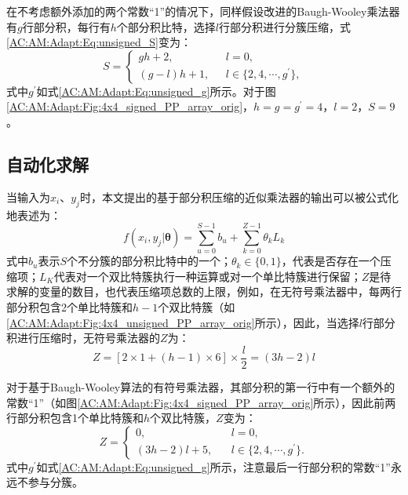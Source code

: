 在不考虑额外添加的两个常数“1”的情况下，同样假设改进的Baugh-Wooley乘法器有$g$行部分积，每行有$h$个部分积比特，选择$l$行部分积进行分簇压缩，式\eqref{AC:AM:Adapt:Eq:unsigned_S}变为：
\begin{equation}
    \label{AC:AM:Adapt:Eq:signed_S}
        S = \left\{
          \begin{aligned}
            gh + 2, \ \ \ & \ \ \ l = 0, \\
            (g - l)h + 1, & \ \ \ l \in \{2, 4, \cdots, g^{\prime} \},
          \end{aligned}
          \right.
\end{equation}
式中$g^{\prime}$如式\eqref{AC:AM:Adapt:Eq:unsigned_g}所示。对于图\ref{AC:AM:Adapt:Fig:4x4_signed_PP_array_orig}，$ h = g = g^{\prime} = 4 $，$ l = 2 $，$ S = 9 $。


\subsection{自动化求解}

当输入为$x_i$、$y_j$时，本文提出的基于部分积压缩的近似乘法器的输出可以被公式化地表述为：
\begin{equation}
\label{AC:AM:Adapt:Eq:f}
    f(x_i, y_j \vert \boldsymbol{\theta}) =  \sum\limits_{u=0}^{S-1} b_u + \sum\limits_{k=0}^{Z-1} \theta_k L_k
\end{equation}
式中$b_u$表示$S$个不分簇的部分积比特中的一个；$\theta_k \in \{0, 1\}$，代表是否存在一个压缩项；$L_K$代表对一个双比特簇执行一种运算或对一个单比特簇进行保留；$Z$是待求解的变量的数目，也代表压缩项总数的上限，例如，在无符号乘法器中，每两行部分积包含2个单比特簇和$h-1$个双比特簇（如\ref{AC:AM:Adapt:Fig:4x4_unsigned_PP_array_orig}所示），因此，当选择$l$行部分积进行压缩时，无符号乘法器的$Z$为：
\begin{equation}
    \label{AC:AM:Adapt:Eq:Z_unsigned}
      Z = [2 \times 1 + (h-1) \times 6] \times \frac{l}{2} = (3h-2)l
\end{equation}

对于基于Baugh-Wooley算法的有符号乘法器，其部分积的第一行中有一个额外的常数“1”（如图\ref{AC:AM:Adapt:Fig:4x4_signed_PP_array_orig}所示），因此前两行部分积包含1个单比特簇和$h$个双比特簇，$Z$变为：
\begin{equation}
    \label{AC:AM:Adapt:Eq:Z_signed}
        Z = \left\{
          \begin{aligned}
            0 , \ \ \ \ \ \  & \ \ \ \ l = 0, \\
            (3h-2)l + 5, & \ \ \ \  l \in \{2, 4, \cdots, g^{\prime} \}.
            \end{aligned}
          \right.
\end{equation}
式中$g^{\prime}$如式\eqref{AC:AM:Adapt:Eq:unsigned_g}所示，注意最后一行部分积的常数“1”永远不参与分簇。


